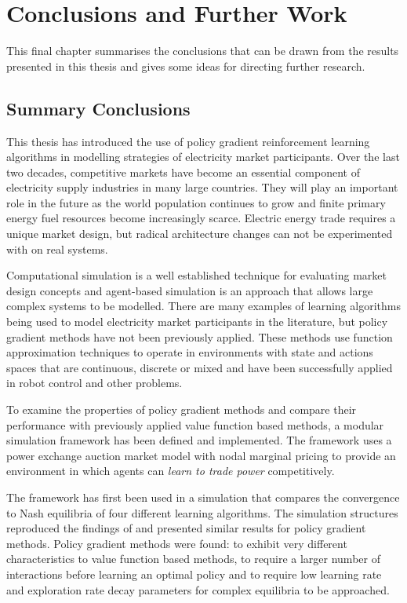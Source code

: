 \chapter{Conclusions and Further Work}
\label{ch:conclusion}
This final chapter summarises the conclusions that can be drawn from the
results presented in this thesis and gives some ideas for directing further
research.

\section{Summary Conclusions}
This thesis has introduced the use of policy gradient reinforcement learning
algorithms in modelling strategies of electricity market participants. Over
the last two decades, competitive markets have become an essential component of
electricity supply industries in many large countries.  They will play an
important role in the future as the world population continues to grow and
finite primary energy fuel resources become increasingly scarce.  Electric
energy trade requires a unique market design, but radical architecture changes
can not be experimented with on real systems.

Computational simulation is a well established technique for evaluating market
design concepts and agent-based simulation is an approach that allows large
complex systems to be modelled.  There are many examples of learning algorithms
being used to model electricity market participants in the literature, but
policy gradient methods have not been previously applied.  These
methods use function approximation techniques to operate in environments
with state and actions spaces that are continuous, discrete or mixed and have
been successfully applied in robot control and other problems.

To examine the properties of policy gradient methods and compare their
performance with previously applied value function based methods, a modular
simulation framework has been defined and implemented.  The framework uses a
power exchange auction market model with nodal marginal pricing to provide an
environment in which agents can \textit{learn to trade power} competitively.

The framework has first been used in a simulation that compares the convergence
to Nash equilibria of four different learning algorithms.  The simulation
structures reproduced the findings of  and presented
similar results for policy gradient methods.  Policy gradient methods were
found: to exhibit very different characteristics to value function based
methods, to require a larger number of interactions before learning an optimal
policy and to require low learning rate and exploration rate decay parameters
for complex equilibria to be approached.


